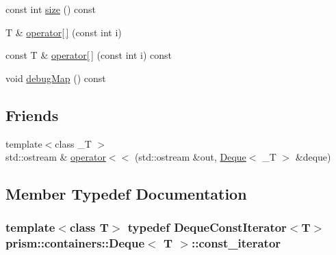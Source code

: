 \begin{DoxyCompactItemize}
\item 
const int \hyperlink{classprism_1_1containers_1_1_deque_a4a2d2f35b50d44fc393f3f08ea3ff1df}{size} () const 
\item 
T \& \hyperlink{classprism_1_1containers_1_1_deque_ac0e7969672a2b126068bbab2ea173e05}{operator\mbox{[}$\,$\mbox{]}} (const int i)
\item 
const T \& \hyperlink{classprism_1_1containers_1_1_deque_ac5a07c9599f649ea42ca30807c5c6bf5}{operator\mbox{[}$\,$\mbox{]}} (const int i) const 
\item 
void \hyperlink{classprism_1_1containers_1_1_deque_ab42eb9448dbb07761f0467268f5aaae3}{debug\+Map} () const 
\end{DoxyCompactItemize}
\subsection*{Friends}
\begin{DoxyCompactItemize}
\item 
{\footnotesize template$<$class \+\_\+T $>$ }\\std\+::ostream \& \hyperlink{classprism_1_1containers_1_1_deque_af53b8d555654cf715b319caeeecb1a92}{operator$<$$<$} (std\+::ostream \&out, \hyperlink{classprism_1_1containers_1_1_deque}{Deque}$<$ \+\_\+T $>$ \&deque)
\end{DoxyCompactItemize}


\subsection{Member Typedef Documentation}
\subsubsection[{\texorpdfstring{const\+\_\+iterator}{const_iterator}}]{\setlength{\rightskip}{0pt plus 5cm}template$<$class T$>$ typedef Deque\+Const\+Iterator$<$T$>$ {\bf prism\+::containers\+::\+Deque}$<$ T $>$\+::{\bf const\+\_\+iterator}}\hypertarget{classprism_1_1containers_1_1_deque_acd441aa1f776dfe56929dfb0449ba73f}{}\label{classprism_1_1containers_1_1_deque_acd441aa1f776dfe56929dfb0449ba73f}

